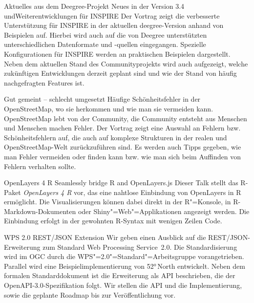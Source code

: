 %
{Aktuelles aus dem Deegree-Projekt}%
{Neues in der Version 3.4 und\linebreak Weiterentwicklungen für INSPIRE}%
{%
Der Vortrag zeigt die verbesserte Unterstützung für INSPIRE in der aktuellen
deegree-Version anhand von Beispielen auf. Hierbei wird auch auf die von
Deegree unterstützten unterschiedlichen Datenformate und -quellen eingegangen.
Spezielle Konfigurationen für INSPIRE werden an praktischen Beispielen
dargestellt. Neben dem aktuellen Stand des Communityprojekts wird auch
aufgezeigt, welche zukünftigen Entwicklungen derzeit geplant sind und wie der
Stand von häufig nachgefragten Features ist.%
}



%
{Gut gemeint -- schlecht umgesetzt}%
{Häufige Schönheitsfehler in der OpenStreetMap, wo sie herkommen und wie man sie vermeiden kann.}%
{%
OpenStreetMap lebt von der Community, die Community entsteht aus Menschen und
Menschen machen Fehler. Der Vortrag zeigt eine Auswahl an Fehlern bzw.
Schönheitsfehlern auf, die auch auf komplexe Strukturen in der realen und
OpenStreetMap-Welt zurückzuführen sind. Es werden auch Tipps gegeben, wie man Fehler
vermeiden oder finden kann bzw. wie man sich beim Auffinden von Fehlern
verhalten sollte.%
}

%
{OpenLayers 4 R}%
{Seamlessly bridge R and OpenLayers.js}%
{%
Dieser Talk stellt das R-Paket \emph{OpenLayers 4 R} vor, das eine nahtlose
Einbindung von OpenLayers in R ermöglicht. Die Visualisierungen können dabei
direkt in der R"=Konsole, in R-Markdown-Dokumenten oder
Shiny"=Web"=Applikationen angezeigt werden. Die Einbindung erfolgt in der
gewohnten R-Syntax mit wenigen Zeilen Code.%
}

%
{WPS 2.0 REST/JSON Extension}%
{}%
{%
Wir geben einen Ausblick auf die REST/JSON-Erweiterung zum Standard Web
Processing Service~2.0. Die Standardisierung wird im OGC durch die
WPS"=2.0"=Standard"=Arbeitsgruppe vorangetrieben. Parallel wird eine
Beispielimplementierung von 52°\,North entwickelt. Neben dem formalen
Standarddokument ist die Erweiterung als API beschrieben, die der
OpenAPI-3.0-Spezifikation folgt. Wir stellen die API und die Implementierung,
sowie die geplante Roadmap bis zur Veröffentlichung vor.%
}

